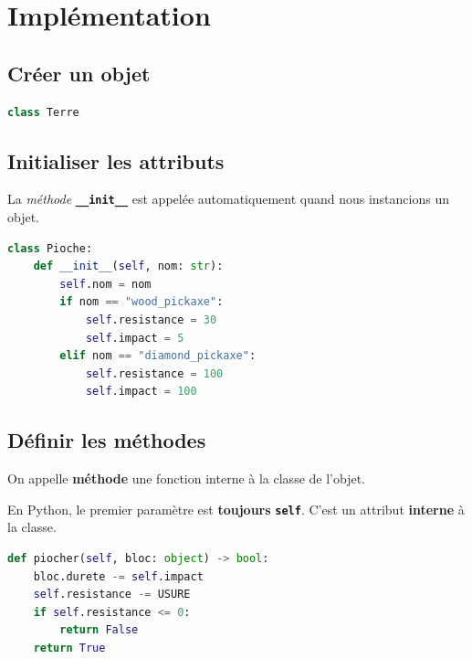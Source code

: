 \documentclass[a4paper,11pt]{article}
\begin{document}
\section{Implémentation}
\subsection{Créer un objet}
\begin{center}
\begin{lstlisting}[language=Python  , xleftmargin=2em, xrightmargin=2em]
class Terre
\end{lstlisting}
\label{CODE}
\end{center}
\subsection{Initialiser les attributs}
La \emph{méthode} \texttt{\textbf{\_\_init\_\_}} est appelée automatiquement quand nous instancions un objet.
\begin{center}
\begin{lstlisting}[language=Python , xleftmargin=2em, xrightmargin=2em]
class Pioche:
    def __init__(self, nom: str):
        self.nom = nom
        if nom == "wood_pickaxe":
            self.resistance = 30
            self.impact = 5
        elif nom == "diamond_pickaxe":
            self.resistance = 100
            self.impact = 100
\end{lstlisting}
\label{CODE}
\end{center}

\subsection{Définir les méthodes}
\begin{aretenir}
    On appelle \textbf{méthode} une fonction interne à la classe de l'objet. 

    En Python, le premier paramètre est \textbf{toujours} \textbf{\texttt{self}}. C'est un attribut \textbf{interne} à la classe.
\end{aretenir}
\begin{center}
    \begin{lstlisting}[language=Python, xleftmargin=2em, xrightmargin=2em]
def piocher(self, bloc: object) -> bool:
    bloc.durete -= self.impact
    self.resistance -= USURE
    if self.resistance <= 0:
        return False
    return True
\end{lstlisting}
    \end{center}
\end{document}

